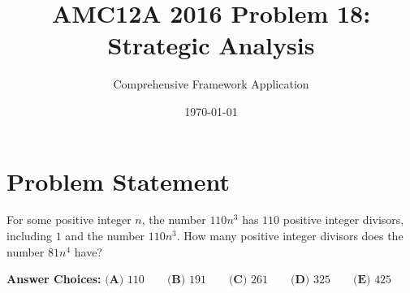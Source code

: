 \documentclass[]{article}
\begin{document}
\title{AMC12A 2016 Problem 18: Strategic Analysis}
\author{Comprehensive Framework Application}
\date{\today}
\maketitle

\section*{Problem Statement}

For some positive integer $n$, the number $110n^3$ has $110$ positive integer divisors, including $1$ and the number $110n^3$. How many positive integer divisors does the number $81n^4$ have?

\textbf{Answer Choices:} $\textbf{(A) }110\qquad\textbf{(B) }191\qquad\textbf{(C) }261\qquad\textbf{(D) }325\qquad\textbf{(E) }425$
\end{document}
